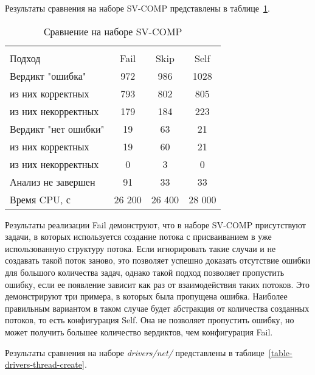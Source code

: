 Результаты сравнения на наборе SV-COMP представлены в таблице~\ref{table-svcomp-thread-create}.

  \begin{table}[h]\footnotesize \centering
    \caption{Сравнение на наборе SV-COMP}
  	\label{table-svcomp-thread-create}
    \begin{tabular}{ | l | c | c | c |}
      \hline
      		& 		\multicolumn{3}{c|}{\theory}  \\
      Подход         				& Fail 	& Skip 	& Self  	\\ \hline
      Вердикт "ошибка" 				& 972   & 986   & 1028       \\ 
  \hspace{0.5cm} из них корректных 	& 793 	& 802 	& 805    	\\ 
  \hspace{0.5cm} из них некорректных & 179 	& 184 	& 223     	\\ \hline
      Вердикт "нет ошибки"  		& 19    & 63    & 21       	\\ 
  \hspace{0.5cm} из них корректных 	& 19 	& 60    & 21      	\\
  \hspace{0.5cm} из них некорректных & 0 	& 3    	& 0     	\\ \hline
      Анализ не завершен       		& 91    & 33    & 33    	\\ \hline
      Время CPU, с   				& 26 200 & 26 400 & 28 000  \\ 
      \hline
    \end{tabular}
  \end{table}

Результаты реализации Fail демонструют, что в наборе SV-COMP присутствуют задачи, в которых используется создание потока с присваиванием в уже использованную структуру потока. 
Если игнорировать такие случаи и не создавать такой поток заново, это позволяет успешно доказать отсутствие ошибки для большого количества задач, однако такой подход позволяет пропустить ошибку, если ее появление зависит как раз от взаимодействия таких потоков.
Это демонстрируют три примера, в которых была пропущена ошибка.
Наиболее правильным вариантом в таком случае будет абстракция от количества созданных потоков, то есть конфигурация Self. 
Она не позволяет пропустить ошибку, но может получить большее количество вердиктов, чем конфигурация Fail.

Результаты сравнения на наборе \textit{drivers/net/} представлены в таблице~\ref{table-drivers-thread-create}.

